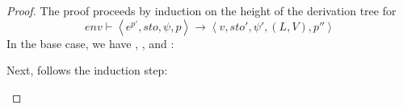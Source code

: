 \documentclass[../../../master.tex]{subfiles}
\begin{document}
\begin{proof}
	The proof proceeds by induction on the height of the derivation tree for 
	$$env\vdash\left\langle e^{p'},sto,\psi,p\right\rangle\rightarrow\left\langle v,sto',\psi',(L,V),p''\right\rangle$$
	In the base case, we have , , and :
	\begin{description}
		
		
		
	\end{description}

	Next, follows the induction step:
	\begin{description}
		
		
		
		
		
		
		
		
		
	\end{description}
\end{proof}
\end{document}
